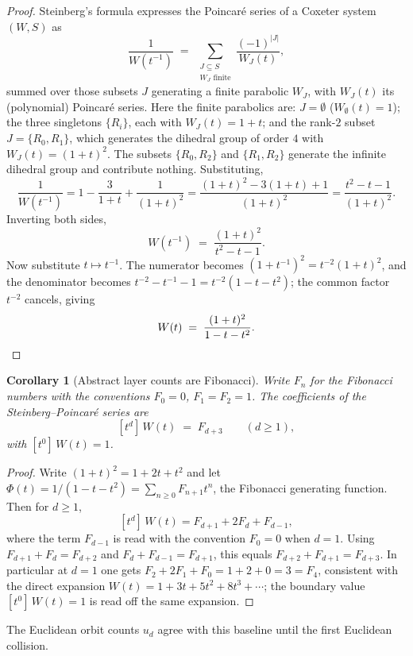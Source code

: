 \documentclass[11pt]{article}
\theoremstyle{plain}
\newtheorem{corollary}[theorem]{Corollary}
\theoremstyle{definition}
\theoremstyle{remark}
\begin{document}
\begin{proof}
Steinberg's formula \cite{Humphreys1990} expresses the Poincar\'e series of a Coxeter system $(W,S)$ as
\[
  \frac{1}{W(t^{-1})} \;=\; \sum_{\substack{J \subseteq S \\ W_J \text{ finite}}} \frac{(-1)^{|J|}}{W_J(t)},
\]
summed over those subsets $J$ generating a finite parabolic $W_J$, with $W_J(t)$ its (polynomial) Poincar\'e series. Here the finite parabolics are: $J = \emptyset$ ($W_\emptyset(t) = 1$); the three singletons $\{R_i\}$, each with $W_J(t) = 1+t$; and the rank-$2$ subset $J = \{R_0, R_1\}$, which generates the dihedral group of order $4$ with $W_J(t) = (1+t)^2$. The subsets $\{R_0,R_2\}$ and $\{R_1,R_2\}$ generate the infinite dihedral group and contribute nothing. Substituting,
\[
  \frac{1}{W(t^{-1})}
  = 1 - \frac{3}{1+t} + \frac{1}{(1+t)^2}
  = \frac{(1+t)^2 - 3(1+t) + 1}{(1+t)^2}
  = \frac{t^2 - t - 1}{(1+t)^2}.
\]
Inverting both sides,
\[
  W(t^{-1}) \;=\; \frac{(1+t)^2}{t^2 - t - 1}.
\]
Now substitute $t \mapsto t^{-1}$. The numerator becomes $(1 + t^{-1})^2 = t^{-2}(1+t)^2$, and the denominator becomes $t^{-2} - t^{-1} - 1 = t^{-2}(1 - t - t^2)$; the common factor $t^{-2}$ cancels, giving
\[
  W(t) \;=\; \frac{(1+t)^2}{1 - t - t^2}. \qedhere
\]
\end{proof}

\begin{corollary}[Abstract layer counts are Fibonacci]
\label{cor:abstract-fibonacci}
Write $F_n$ for the Fibonacci numbers with the conventions $F_0 = 0$, $F_1 = F_2 = 1$. The coefficients of the Steinberg--Poincar\'e series are
\[
  [t^d]\, W(t) \;=\; F_{d+3}
  \qquad (d \ge 1),
\]
with $[t^0]\, W(t) = 1$.
\end{corollary}

\begin{proof}
Write $(1+t)^2 = 1 + 2t + t^2$ and let $\Phi(t) = 1/(1 - t - t^2) = \sum_{n \ge 0} F_{n+1} t^n$, the Fibonacci generating function. Then for $d \ge 1$,
\[
  [t^d]\, W(t) = F_{d+1} + 2 F_{d} + F_{d-1},
\]
where the term $F_{d-1}$ is read with the convention $F_0 = 0$ when $d = 1$. Using $F_{d+1} + F_d = F_{d+2}$ and $F_d + F_{d-1} = F_{d+1}$, this equals $F_{d+2} + F_{d+1} = F_{d+3}$. In particular at $d = 1$ one gets $F_2 + 2F_1 + F_0 = 1 + 2 + 0 = 3 = F_4$, consistent with the direct expansion $W(t) = 1 + 3t + 5t^2 + 8t^3 + \cdots$; the boundary value $[t^0]\,W(t) = 1$ is read off the same expansion.
\end{proof}

The Euclidean orbit counts $u_d$ agree with this baseline until the first Euclidean collision.
\end{document}
